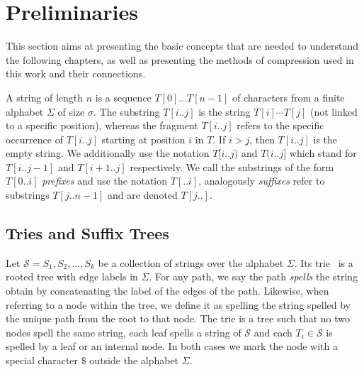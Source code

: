 \section{Preliminaries}\label{sec:prelim}


This section aims at presenting the basic concepts that are needed to understand the following chapters, as well as presenting the methods of compression used in this work and their connections.

A string of length $n$ is a sequence $T[0] \dots T[n-1]$ of characters from a finite alphabet $\Sigma$ of size $\sigma$. The substring $T[i..j]$ is the string $T[i] \cdots T[j]$ (not linked to a specific position), whereas the fragment $T[i..j]$ refers to the specific occurrence of $T[i..j]$ starting at position $i$ in $T$. If $i > j$, then $T[i..j]$ is the empty string. We additionally use the notation $T[i..j)$ and $T(i..j]$ which stand for $T[i..j-1]$ and $T[i+1..j]$ respectively. We call the substrings of the form $T[0..i]$ \emph{prefixes}  and use the notation $T[..i]$, analogously \emph{suffixes} refer to substrings $T[j..n-1]$ and are denoted $T[j..]$.

\subsection{Tries and Suffix Trees}\label{sec:prelim:tries}
Let $\mathcal{S} = {S_1,S_2, ..., S_k}$ be a collection of strings over the alphabet $\Sigma$. Its trie~\cite{thue1912gegenseitige,de1959file,fredkin1960trie} is a rooted tree with edge labels in $\Sigma$.
For any path, we say the path \emph{spells} the string obtain by concatenating the label of the edges of the path.
Likewise, when referring to a node within the tree, we define it as spelling the string spelled by the unique path from the root to that node.
The trie is a tree such that no two nodes spell the same string, each leaf spells a string of $\mathcal{S}$ and each $T_i \in \mathcal{S}$ is spelled by a leaf or an internal node. In both cases we mark the node with a special character $\$$ outside the alphabet $\Sigma$.

